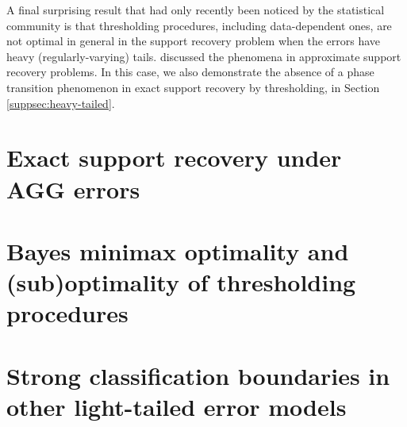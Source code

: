\medskip

A final surprising result that had only recently been noticed by the statistical community is that thresholding procedures, including data-dependent ones, are not optimal in general in the support recovery problem when the errors have heavy (regularly-varying) tails. 
\citet{arias2019detection} discussed the phenomena in approximate support recovery problems.
In this case, we also demonstrate the absence of a phase transition phenomenon in exact support recovery by thresholding, in Section \ref{suppsec:heavy-tailed}. 






\section{Exact support recovery under AGG errors}
\label{sec:boundary}



\section{Bayes minimax optimality and (sub)optimality of thresholding procedures}
\label{sec:optimality}



\section{Strong classification boundaries in other light-tailed error models}
\label{suppsec:other-boundaries}



